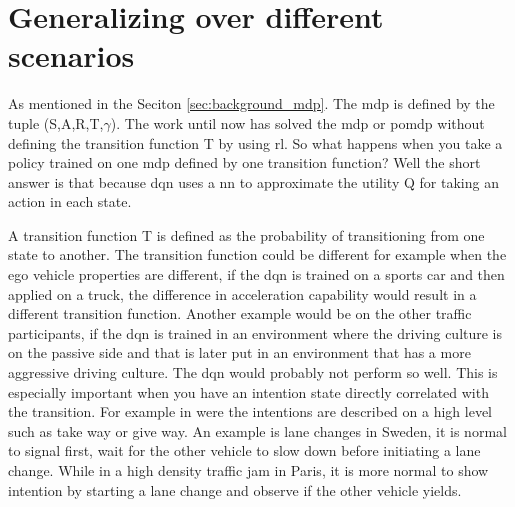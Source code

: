 \chapter{Generalizing over different scenarios} \label{ch:generalize}

As mentioned in the Seciton \ref{sec:background_mdp}. The \gls{mdp} is defined by the tuple (S,A,R,T,$\gamma$). The work until now has solved the \gls{mdp} or \gls{pomdp} without defining the transition function T by using \gls{rl}. So what happens when you take a policy trained on one \gls{mdp} defined by one transition function? Well the short answer is that because \gls{dqn} uses a \gls{nn} to approximate the utility Q for taking an action in each state. 

A transition function T is defined as the probability of transitioning from one state to another. The transition function could be different for example when the ego vehicle properties are different, if the \gls{dqn} is trained on a sports car and then applied on a truck, the difference in acceleration capability would result in a different transition function. Another example would be on the other traffic participants, if the \gls{dqn} is trained in an environment where the driving culture is on the passive side and that is later put in an environment that has a more aggressive driving culture. The \gls{dqn} would probably not perform so well. 
This is especially important when you have an intention state directly correlated with the transition. For example in \paperD were the intentions are described on a high level such as take way or give way. 
An example is lane changes in Sweden, it is normal to signal first, wait for the other vehicle to slow down before initiating a lane change. While in a high density traffic jam in Paris, it is more normal to show intention by starting a lane change and observe if the other vehicle yields. 

